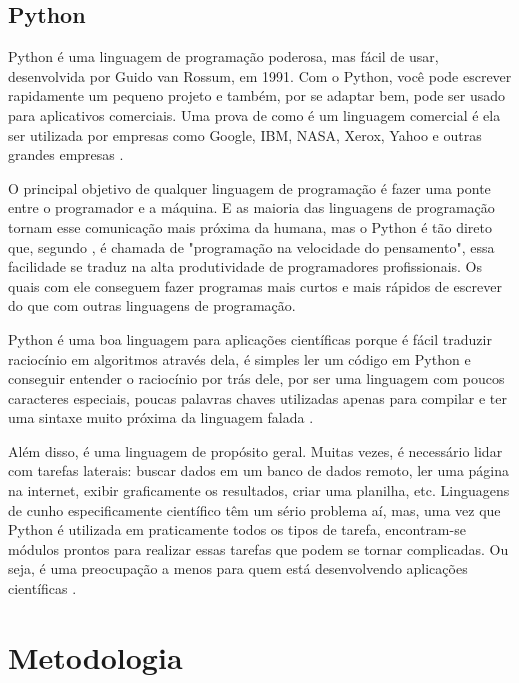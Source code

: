 \section{Python}

Python é uma linguagem de programação poderosa, mas fácil de usar, desenvolvida por Guido van Rossum, em 1991. Com o Python, você pode escrever rapidamente um pequeno projeto e também, por se adaptar bem, pode ser usado para aplicativos comerciais. Uma prova de como é um linguagem comercial é ela ser utilizada por empresas como Google, IBM, NASA, Xerox, Yahoo e outras grandes empresas \cite{dawson2010}.

O principal objetivo de qualquer linguagem de programação é fazer uma ponte entre o programador e a máquina. E as maioria das linguagens de programação tornam esse comunicação mais próxima da humana, mas o Python é tão direto que, segundo \cite{dawson2010}, é chamada de "programação na velocidade do pensamento", essa facilidade se traduz na alta produtividade de programadores profissionais. Os quais com ele conseguem fazer programas mais curtos e mais rápidos de escrever do que com outras linguagens de programação. 

Python é uma boa linguagem para aplicações científicas porque é fácil traduzir raciocínio em algoritmos através dela, é simples ler um código em Python e conseguir entender o raciocínio por trás dele, por ser uma linguagem com poucos caracteres especiais, poucas palavras chaves utilizadas apenas para compilar e ter uma sintaxe muito próxima da linguagem falada \cite{reitz2018}.

Além disso, é uma linguagem de propósito geral. Muitas vezes, é necessário lidar com tarefas laterais: buscar dados em um banco de dados remoto, ler uma página na internet, exibir graficamente os resultados, criar uma planilha, etc. Linguagens de cunho especificamente científico têm um sério problema aí, mas, uma vez que Python é utilizada em praticamente todos os tipos de tarefa, encontram-se módulos prontos para realizar essas tarefas que podem se tornar complicadas. Ou seja, é uma preocupação a menos para quem está desenvolvendo aplicações científicas \cite{downey2012}.
  





\chapter[Metodologia]{Metodologia}

